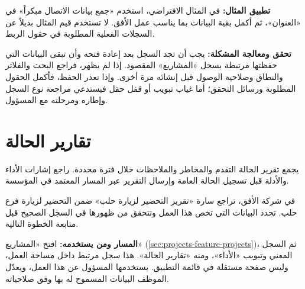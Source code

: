 \textbf{تطبيق المثال:} في المثال الافتراضي، استخدم «جمع بيانات الاتصال مبكراً» في «العنوان»، ثم أكمل بقية البيانات بما يناسب عمل الأفق. لا تستخدم قيم المثال بديلاً عن السجلات الفعلية المطلوبة في حقول الربط.

\textbf{تحقق ومعالجة المشكلة:} يجب أن تجد السجل بعد إعادة فتحه وأن تبقى البيانات التي حفظتها مرتبطة بسجل «المشاريع» المقصود. إذا لم يظهر، فراجع البحث والفلاتر والنطاق وصلاحية الوصول قبل إنشائه مرة أخرى. وإذا تعذر الحفظ، فأكمل الحقول المطلوبة ورسائل التحقق؛ أما غياب تبويب أو قفل حقل فيستدعي مراجعة نوع السجل وإطاره ومرحلته مع المسؤول.

\clearpage
\section{تقارير الحالة}
\label{sec:projects-feature-status-reports}

يجمع تقرير الحالة التقدم والمخاطر والملاحظات خلال فترة محددة. راجع إشارات الأداء والأدلة قبل تسجيل الحالة العامة وإرسال التقرير عبر المسار المعتمد في المؤسسة.

\begin{rcnote}
في شركة الأفق، تراجع سارة «تقرير التحضير لزيارة حلب» ضمن التحضير لزيارة فرع حلب. تحدد البيانات التي تخص هذا العمل وتتحقق من ظهورها في السجل الصحيح قبل متابعة الخطوة التالية.
\end{rcnote}

\textbf{المسار ومن يستخدمه:} افتح «المشاريع» (\ref{sec:projects-feature-projects})، ثم السجل المعني وتبويب «الأداء»، ومنه «تقارير الحالة». هذا سجل مرتبط داخل مساحة العمل، وليس صفحة مستقلة في قائمة التطبيق. يستخدمها المسؤول عن هذا العمل، ويعدّل الموظف البيانات المسموح له بها وفق صلاحياته.

